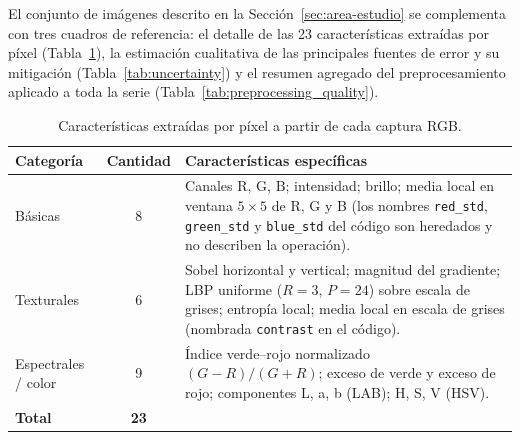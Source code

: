 El conjunto de imágenes descrito en la Sección~\ref{sec:area-estudio} se complementa con tres cuadros de referencia: el detalle de las 23 características extraídas por píxel (Tabla~\ref{tab:features}), la estimación cualitativa de las principales fuentes de error y su mitigación (Tabla~\ref{tab:uncertainty}) y el resumen agregado del preprocesamiento aplicado a toda la serie (Tabla~\ref{tab:preprocessing_quality}).

\begin{table}[h]
\centering
\caption{Características extraídas por píxel a partir de cada captura RGB.}
\begin{tabular}{|l|c|p{8cm}|}
\hline
	\textbf{Categoría} & \textbf{Cantidad} & \textbf{Características específicas} \\
\hline
Básicas & 8 & Canales R, G, B; intensidad; brillo; media local en ventana $5\times5$ de R, G y B (los nombres \texttt{red\_std}, \texttt{green\_std} y \texttt{blue\_std} del código son heredados y no describen la operación). \\
\hline
Texturales & 6 & Sobel horizontal y vertical; magnitud del gradiente; LBP uniforme ($R = 3$, $P = 24$) sobre escala de grises; entropía local; media local en escala de grises (nombrada \texttt{contrast} en el código). \\
\hline
Espectrales / color & 9 & Índice verde--rojo normalizado $(G-R)/(G+R)$; exceso de verde y exceso de rojo; componentes L, a, b (LAB); H, S, V (HSV). \\
\hline
	\textbf{Total} & \textbf{23} & \\
\hline
\end{tabular}
\label{tab:features}
\end{table}

